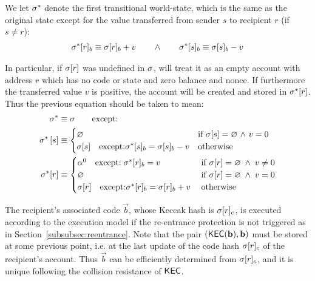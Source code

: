 We let $\mathbf{\sigma}^*$ denote the first transitional world-state, which is the same as the original state except for the value transferred from sender $s$ to recipient $r$ (if $s\ne r$):
\begin{align}
	\mathbf{\sigma}^*[r]_b\equiv \mathbf{\sigma}[r]_b+v \qquad \land  \qquad\mathbf{\sigma}^*[s]_b\equiv \mathbf{\sigma}[s]_b-v
	\label{state:first transitional}
\end{align}

In particular, if $\mathbf{\sigma}[r]$ was undefined in $\mathbf{\sigma}$, \name will treat it as an empty account with address $r$ which has no code or state and zero balance and nonce.
If furthermore the transferred value $v$ is positive, the account will be created and stored in $\mathbf{\sigma}^*[r]$. 
Thus the previous equation should be taken to mean:
\begin{align}
	\mathbf{\sigma}^* &\equiv \mathbf{\sigma} \qquad \mbox{except:}\\
	\mathbf{\sigma}^*\left[ s \right] &\equiv \begin{cases}
		\varnothing & \mbox{if $\mathbf{\sigma}[s]=\varnothing$ $\land$ $v=0$}\\
		\mathbf{\sigma}[s]\quad\mbox{except:}\mathbf{\sigma}^*[s]_b=\mathbf{\sigma}[s]_b-v & \mbox{otherwise}
	\end{cases}\\
	\mathbf{\sigma}^*[r] &\equiv \begin{cases}
		\mathbf{\alpha}^0 \quad\text{except:}\; \mathbf{\sigma}^*[r]_b=v  & \mbox{if $\mathbf{\sigma}[r]=\varnothing \;\land\; v\ne 0$}\\
		\varnothing & \mbox{if $\mathbf{\sigma}[r]=\varnothing \;\land\; v = 0$}\\
		\mathbf{\sigma}[r]\quad\mbox{except:}\mathbf{\sigma}^*[r]_b=\mathbf{\sigma}[r]_b+v\; & \mbox{otherwise}
	\end{cases}
\end{align}

The recipient's associated code $\vec{b}$, whose Keccak hash is $\mathbf{\sigma}[r]_c$, is executed according to the execution model if the re-entrance protection is not triggered as in Section~\ref{subsubsec:reentrance}.
Note that the pair $\left( \mathsf{KEC}(\mathbf{b}), \mathbf{b} \right)$ must be stored at some previous point, i.e. at the last update of the code hash $\mathbf{\sigma}[r]_c$ of the recipient's account. 
Thus $\vec{b}$ can be efficiently determined from $\mathbf{\sigma}[r]_c$,
and it is unique following the collision resistance of $\mathsf{KEC}$.

